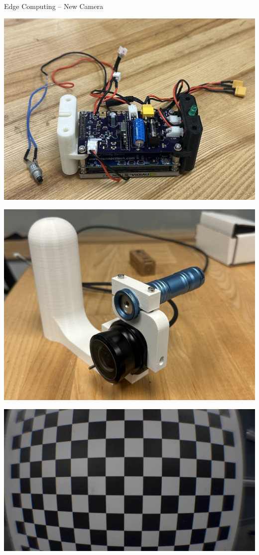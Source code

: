 \begin{frame}{Edge Computing – New Camera}
    \centering
    \begin{minipage}[t]{0.32\textwidth}
        \centering
        \includegraphics[width=\linewidth]{images/IMG_4633.jpeg}
    \end{minipage}%
    \hfill
    \begin{minipage}[t]{0.32\textwidth}
        \centering
        \includegraphics[width=\linewidth]{images/IMG_4635.jpeg}
    \end{minipage}%
    \hfill
    \begin{minipage}[t]{0.32\textwidth}
        \centering
        \includegraphics[width=\linewidth]{images/close_exploreHD_screenshot_14.07.2025.png}

\end{minipage}
\end{frame}
